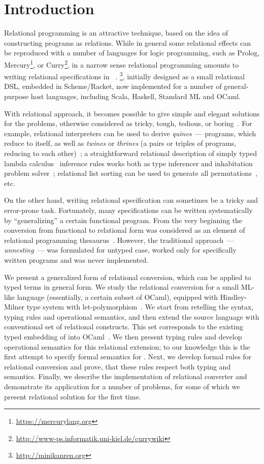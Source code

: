 \section{Introduction}
\label{intro}

Relational programming is an attractive technique, based on the idea of constructing programs as relations.
While in general some relational effects can be reproduced with a number of languages for logic programming, such as
Prolog, Mercury\footnote{\url{https://mercurylang.org}}, or Curry\footnote{\url{http://www-ps.informatik.uni-kiel.de/currywiki}}, in
a narrow sense relational programming amounts to writing relational specifications in \miniKanren~\cite{TRS,MicroKanren}. \miniKanren\footnote{\url{http://minikanren.org}},
initially designed as a small relational DSL, embedded in Scheme/Racket, now implemented for a number of general-purpose host languages,
including Scala, Haskell, Standard ML and OCaml.

With relational approach, it becomes possible to give simple and elegant solutions for the problems, otherwise
considered as tricky, tough, tedious, or boring~\cite{unified}. For example, relational interpreters can be used to derive
\emph{quines}~--- programs, which reduce to itself, as well as \emph{twines} or \emph{thrines} (a pairs or triples of
programs, reducing to each other)~\cite{Untagged}; a straightforward relational description of
simply typed lambda calculus~\cite{Lambda} inference rules works both as type inferencer and inhabitation problem solver~\cite{WillThesis};
relational list sorting can be used to generate all permutations~\cite{ocanren}, etc. 

On the other hand, writing relational specification can sometimes be a tricky and error-prone task. Fortunately, many 
specifications can be written systematically by ``generalizing'' a certain functional program. From the very beginning 
the conversion from functional to relational form was considered as an element of relational programming thesaurus~\cite{TRS}. However,
the traditional approach~--- \emph{unnesting}~--- was formulated for untyped case, worked only for specifically written
programs and was never implemented.

We present a generalized form of relational conversion, which can be applied to typed terms in general form. We study the relational conversion 
for a small ML-like language (essentially, a certain subset of OCaml), equipped with Hindley-Milner type system with let-polymorphism~\cite{Types}. 
We start from retelling the syntax, typing rules and operational semantics, and then extend the source language with conventional set of 
relational constructs. This set corresponds to the existing typed embedding of \miniKanren into OCaml~\cite{ocanren}. We then present typing rules and 
develop operational semantics for this relational extension; to our knowledge this is the first attempt to specify formal semantics for
\miniKanren. Next, we develop formal rules for relational conversion and prove, that these rules respect both typing and
semantics. Finally, we describe the implementation of relational converter and demonstrate its application for a number of problems, for some
of which we present relational solution for the first time.
